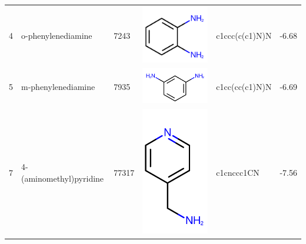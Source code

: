 \documentclass[aps,pre,twocolumn,nofootinbib,superscriptaddress,10pt, final,tightenlines]{revtex4-1}
\begin{document}
\begin{table}
\begin{tabular}{lllp{2cm}>{\ttfamily}lS[table-format=-1.2, table-figures-uncertainty=1]}
4   & o-phenylenediamine       & 7243      & \parbox[c]{1em}{\includegraphics[scale=0.2]{figures/7243.pdf}}  & c1ccc(c(c1)N)N                    & -6.68                                             \\
5   & m-phenylenediamine       & 7935      & \parbox[c]{1em}{\includegraphics[scale=0.2]{figures/7935.pdf}}  & c1cc(cc(c1)N)N                    & -6.69                                             \\
7   & 4-(aminomethyl)pyridine  & 77317     & \parbox[c]{1em}{\includegraphics[scale=0.2]{figures/77317.pdf}} & c1cnccc1CN                        & -7.56                                             \\

\end{tabular}
\end{table}
\end{document}

